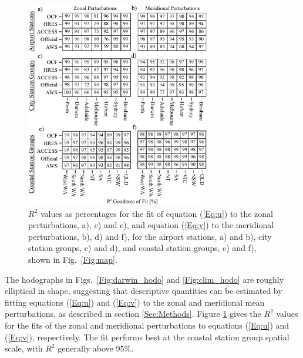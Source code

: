 \documentclass[twocol]{ametsoc}
\begin{document}
\begin{figure}
\centering
\includegraphics[width=19pc]{r_squared.pdf}
\caption{$R^2$ values as percentages for the fit of equation (\ref{Eq:u}) to the zonal perturbations, a), c) and e), and equation (\ref{Eq:v}) to the meridional perturbations, b), d) and f), for the airport stations, a) and b), city station groups, c) and d), and coastal station groups, e) and f), shown in Fig.~\ref{Fig:map}.}
\label{Fig:r_squared}
\end{figure}

The hodographs in Figs.~\ref{Fig:darwin_hodo} and \ref{Fig:clim_hodo} are roughly elliptical in shape, suggesting that descriptive quantities can be estimated by fitting equations (\ref{Eq:u}) and (\ref{Eq:v}) to the zonal and meridional mean perturbations, as described in section \ref{Sec:Methods}. Figure \ref{Fig:r_squared} gives the $R^2$ values for the fits of the zonal and meridional perturbations to equations (\ref{Eq:u}) and (\ref{Eq:v}), respectively. The fit performs best at the coastal station group spatial scale, with $R^2$ generally above $95\%$. 
\end{document}
